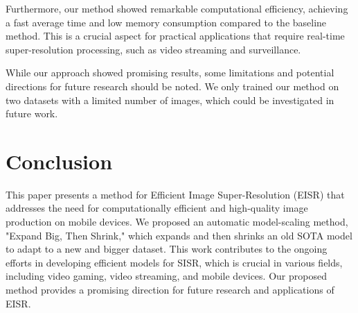 \documentclass[10pt,twocolumn,letterpaper]{article}
\begin{document}
Furthermore, our method showed remarkable computational efficiency, achieving a fast average time and low memory consumption compared to the baseline method. This is a crucial aspect for practical applications that require real-time super-resolution processing, such as video streaming and surveillance.

While our approach showed promising results, some limitations and potential directions for future research should be noted. We only trained our method on two datasets with a limited number of images, which could be investigated in future work.


\section{Conclusion}
\label{sec:conclud}

This paper presents a method for Efficient Image Super-Resolution (EISR) that addresses the need for computationally efficient and high-quality image production on mobile devices. We proposed an automatic model-scaling method, "Expand Big, Then Shrink," which expands and then shrinks an old SOTA model to adapt to a new and bigger dataset. This work contributes to the ongoing efforts in developing efficient models for SISR, which is crucial in various fields, including video gaming, video streaming, and mobile devices. Our proposed method provides a promising direction for future research and applications of EISR.


{\small


}
\end{document}
